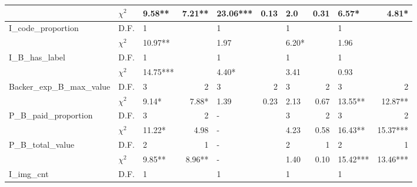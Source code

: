 \documentclass[10pt,journal,compsoc]{IEEEtran}
\begin{document}
\begin{appendices}
\begin{table}[]
\begin{tabular}{lp{0.5cm}p{0.8cm}rp{0.9cm}rp{0.8cm}rp{0.8cm}r}
                 & $\chi^2$ & 9.58** & \multicolumn{1}{p{4em}}{7.21**} & \textbf{23.06***} & \multicolumn{1}{p{3em}}{0.13} & 2.0   & \multicolumn{1}{p{3em}}{0.31} & 6.57* & \multicolumn{1}{p{5.085em}}{4.81*} \bigstrut[b]\\
           \midrule
           \multicolumn{1}{l}{\multirow{2}[2]{*}{I\_code\_proportion}} & D.F.  & 1     &       & 1     &       & 1     &       & 1     &  \bigstrut[t]\\
                 & $\chi^2$ & 10.97** &       & 1.97  &       & 6.20* &       & 1.96  &  \bigstrut[b]\\
           \midrule
           \multicolumn{1}{l}{\multirow{2}[2]{*}{I\_B\_has\_label}} & D.F.  & 1     &       & 1     &       & 1     &       & 1     &  \bigstrut[t]\\
                 & $\chi^2$ & 14.75*** &       & 4.40* &       & 3.41  &       & 0.93  &  \bigstrut[b]\\
           \midrule
           \multicolumn{1}{l}{\multirow{2}[2]{*}{Backer\_exp\_B\_max\_value}} & D.F.  & 3     & \multicolumn{1}{p{4em}}{2} & 3     & \multicolumn{1}{p{3em}}{2} & 3     & \multicolumn{1}{p{3em}}{2} & 3     & \multicolumn{1}{p{5.085em}}{2} \bigstrut[t]\\
                 & $\chi^2$ & 9.14* & \multicolumn{1}{p{4em}}{7.88*} & 1.39  & \multicolumn{1}{p{3em}}{0.23} & 2.13  & \multicolumn{1}{p{3em}}{0.67} & 13.55** & \multicolumn{1}{p{5.085em}}{12.87**} \bigstrut[b]\\
           \midrule
           \multicolumn{1}{l}{\multirow{2}[2]{*}{P\_B\_paid\_proportion}} & D.F.  & 3     & \multicolumn{1}{p{4em}}{2} & -     &       & 3     & \multicolumn{1}{p{3em}}{2} & 3     & \multicolumn{1}{p{5.085em}}{2} \bigstrut[t]\\
                 & $\chi^2$ & 11.22* & \multicolumn{1}{p{4em}}{4.98} & -     &       & 4.23  & \multicolumn{1}{p{3em}}{0.58} & 16.43** & \multicolumn{1}{p{5.085em}}{15.37***} \bigstrut[b]\\
           \midrule
           \multicolumn{1}{l}{\multirow{2}[2]{*}{P\_B\_total\_value}} & D.F.  & 2     & \multicolumn{1}{p{4em}}{1} & -     &       & 2     & \multicolumn{1}{p{3em}}{1} & 2     & \multicolumn{1}{p{5.085em}}{1} \bigstrut[t]\\
                 & $\chi^2$ & 9.85** & \multicolumn{1}{p{4em}}{8.96**} & -     &       & 1.40  & \multicolumn{1}{p{3em}}{0.10} & 15.42*** & \multicolumn{1}{p{5.085em}}{13.46***} \bigstrut[b]\\
           \midrule
           \multicolumn{1}{l}{\multirow{2}[2]{*}{I\_img\_cnt}} & D.F.  & 1     &       & 1     &       & 1     &       & 1     &  \bigstrut[t]\\

\end{tabular}
\end{table}
\end{appendices}
\end{document}
